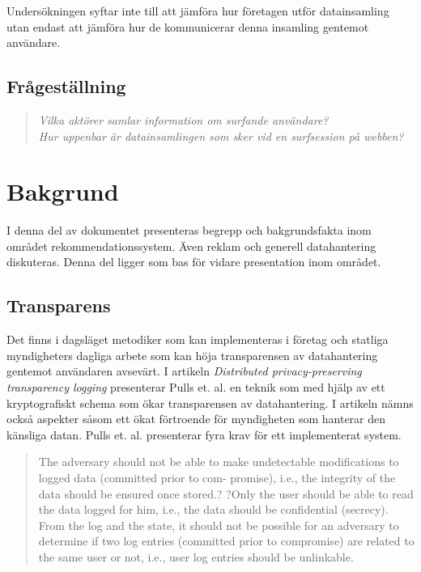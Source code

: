\documentclass[a4paper,11pt]{article}
\begin{document}
{Undersökningen syftar inte till att jämföra hur företagen utför datainsamling utan endast att jämföra hur de kommunicerar denna insamling gentemot användare.

\subsection{Frågeställning}

\begin{quote}
\textit{Vilka aktörer samlar information om surfande användare?} \\

\textit{Hur uppenbar är datainsamlingen som sker vid en surfsession på webben?}
\end{quote}

\section{Bakgrund}
I denna del av dokumentet presenteras begrepp och bakgrundsfakta inom området rekommendationssystem. Även reklam och generell datahantering diskuteras. Denna del ligger som bas för vidare presentation inom området. 
\subsection{Transparens}
Det finns i dagsläget metodiker som kan implementeras i företag och statliga myndigheters dagliga arbete som kan höja transparensen av datahantering gentemot användaren avsevärt. I artikeln \textit{Distributed privacy-preserving transparency logging} presenterar Pulls et. al. \cite{Pulls} en teknik som med hjälp av ett kryptografiskt schema som ökar transparensen av datahantering. I artikeln nämns också aspekter såsom ett ökat förtroende för myndigheten som hanterar den känsliga datan. Pulls et. al. \cite{Pulls} presenterar fyra krav för ett implementerat system. 

\begin{quote}


The adversary should not be able to make undetectable modifications to logged data (committed prior to com- promise), i.e., the integrity of the data should be ensured once stored.?
?Only the user should be able to read the data logged for him, i.e., the data should be confidential (secrecy). \\


From the log and the state, it should not be possible for an adversary to determine if two log entries (committed prior to compromise) are related to the same user or not, i.e., user log entries should be unlinkable. \\


\end{quote}}
\end{document}
